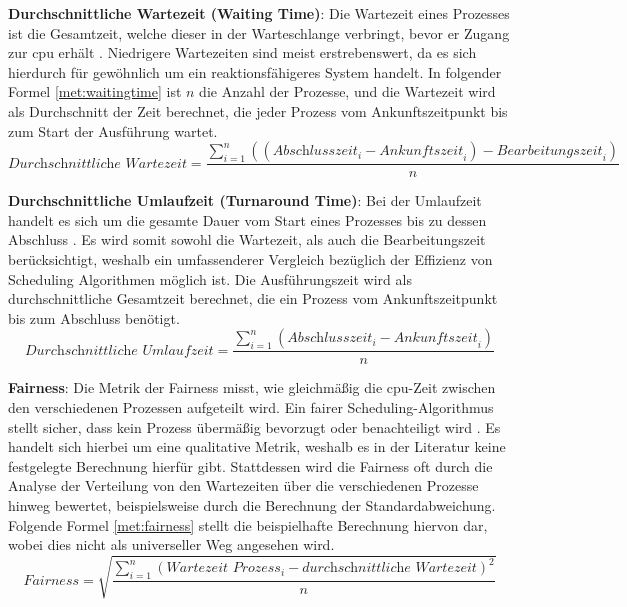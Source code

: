 \textbf{Durchschnittliche Wartezeit (Waiting Time)}: Die Wartezeit eines Prozesses ist die Gesamtzeit, welche dieser in der Warteschlange verbringt, bevor er Zugang zur \ac{cpu} erhält  \autocite{pemasinghe_comparison_2022}. Niedrigere Wartezeiten sind meist erstrebenswert, da es sich hierdurch für gewöhnlich um ein reaktionsfähigeres System handelt. In folgender Formel \ref{met:waitingtime} ist \( n \) die Anzahl der Prozesse, und die Wartezeit wird als Durchschnitt der Zeit berechnet, die jeder Prozess vom Ankunftszeitpunkt bis zum Start der Ausführung wartet.
\begin{equation}
	\textit{Durchschnittliche Wartezeit} = \frac{\sum_{i=1}^{n} ((\textit{Abschlusszeit}_{i} - \textit{Ankunftszeit}_{i}) - \textit{Bearbeitungszeit}_{i})}{n}
	\label{met:waitingtime}
\end{equation}


\textbf{Durchschnittliche Umlaufzeit (Turnaround Time)}: Bei der Umlaufzeit handelt es sich um die gesamte Dauer vom Start eines Prozesses bis zu dessen Abschluss \autocite{pemasinghe_comparison_2022}. Es wird somit sowohl die Wartezeit, als auch die Bearbeitungszeit berücksichtigt, weshalb ein umfassenderer Vergleich bezüglich der Effizienz von Scheduling Algorithmen möglich ist. Die Ausführungszeit wird als durchschnittliche Gesamtzeit berechnet, die ein Prozess vom Ankunftszeitpunkt bis zum Abschluss benötigt.
\begin{equation}
	\textit{Durchschnittliche Umlaufzeit} = \frac{\sum_{i=1}^{n} (\textit{Abschlusszeit}_{i} - \textit{Ankunftszeit}_{i})}{n}
	\label{met:turnaroundtime}
\end{equation}


\textbf{Fairness}: Die Metrik der Fairness misst, wie gleichmäßig die \ac{cpu}-Zeit zwischen den verschiedenen Prozessen aufgeteilt wird. Ein fairer Scheduling-Algorithmus stellt sicher, dass kein Prozess übermäßig bevorzugt oder benachteiligt wird \autocite{haldar_fairness_1991}. Es handelt sich hierbei um eine qualitative Metrik, weshalb es in der Literatur keine festgelegte Berechnung hierfür gibt. Stattdessen wird die Fairness oft durch die Analyse der Verteilung von den Wartezeiten über die verschiedenen Prozesse hinweg bewertet, beispielsweise durch die Berechnung der Standardabweichung. Folgende Formel \ref{met:fairness} stellt die beispielhafte Berechnung hiervon dar, wobei dies nicht als universeller Weg angesehen wird.
\begin{equation}
	\textit{Fairness} = \sqrt{\frac{\sum_{i=1}^{n} (\textit{Wartezeit Prozess}_{i} - \textit{durchschnittliche Wartezeit})^2}{n}}
	\label{met:fairness}
\end{equation}
